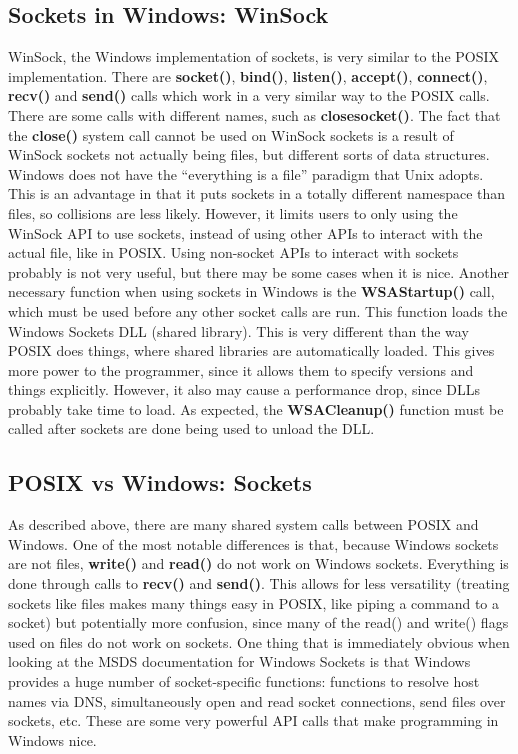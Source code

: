 \documentclass[11pt]{article}
\begin{document}
\subsection{Sockets in Windows: WinSock}
WinSock, the Windows implementation of sockets, is very similar to the POSIX implementation. There are \textbf{socket()}, \textbf{bind()}, \textbf{listen()}, \textbf{accept()}, \textbf{connect()}, \textbf{recv()} and \textbf{send()} calls which work in a very similar way to the POSIX calls. There are some calls with different names, such as \textbf{closesocket()}. The fact that the \textbf{close()} system call cannot be used on WinSock sockets is a result of WinSock sockets not actually being files, but different sorts of data structures. Windows does not have the ``everything is a file'' paradigm that Unix adopts. This is an advantage in that it puts sockets in a totally different namespace than files, so collisions are less likely. However, it limits users to only using the WinSock API to use sockets, instead of using other APIs to interact with the actual file, like in POSIX. Using non-socket APIs to interact with sockets probably is not very useful, but there may be some cases when it is nice. Another necessary function when using sockets in Windows is the \textbf{WSAStartup()} call, which must be used before any other socket calls are run. This function loads the Windows Sockets DLL (shared library). This is very different than the way POSIX does things, where shared libraries are automatically loaded. This gives more power to the programmer, since it allows them to specify versions and things explicitly. However, it also may cause a performance drop, since DLLs probably take time to load. As expected, the \textbf{WSACleanup()} function must be called after sockets are done being used to unload the DLL.\\

\subsection{POSIX vs Windows: Sockets}
As described above, there are many shared system calls between POSIX and Windows. One of the most notable differences is that, because Windows sockets are not files, \textbf{write()} and \textbf{read()} do not work on Windows sockets. Everything is done through calls to \textbf{recv()} and \textbf{send()}. This allows for less versatility (treating sockets like files makes many things easy in POSIX, like piping a command to a socket) but potentially more confusion, since many of the read() and write() flags used on files do not work on sockets. One thing that is immediately obvious when looking at the MSDS documentation for Windows Sockets is that Windows provides a huge number of socket-specific functions: functions to resolve host names via DNS, simultaneously open and read socket connections, send files over sockets, etc. These are some very powerful API calls that make programming in Windows nice.\\
\end{document}
